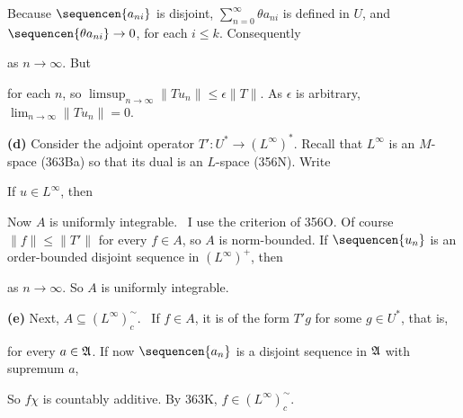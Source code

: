 {Because $\sequencen{a_{ni}}$ is disjoint, 
$\sum_{n=0}^{\infty}\theta a_{ni}$ is defined in $U$, 
and $\sequencen{\theta a_{ni}}\to 0$, for each $i\le k$.   Consequently


\noindent as $n\to\infty$.  But


\noindent for each $n$, so
$\limsup_{n\to\infty}\|Tu_n\|\le\epsilon\|T\|$.   As $\epsilon$ is
arbitrary, $\lim_{n\to\infty}\|Tu_n\|=0$.\ \Qed

\medskip

{\bf (d)} Consider the adjoint operator $T':U^*\to (L^{\infty})^*$.
Recall that $L^{\infty}$ is an $M$-space (363Ba) so that its dual is an
$L$-space (356N).   Write


\noindent If $u\in L^{\infty}$, then


\noindent Now $A$ is uniformly integrable.   \Prf\ I use the criterion
of 356O.   Of course $\|f\|\le\|T'\|$ for every $f\in A$, so $A$ is
norm-bounded.   If $\sequencen{u_n}$ is an order-bounded disjoint
sequence in $(L^{\infty})^+$, then


\noindent as $n\to\infty$.   So $A$ is uniformly integrable.\ \Qed

\medskip

{\bf (e)} Next, $A\subseteq(L^{\infty})^{\sim}_c$.   \Prf\ If $f\in A$,
it is of the form $T'g$ for some $g\in U^*$, that is,


\noindent for every $a\in\frak A$.   If now $\sequencen{a_n}$ is a
disjoint sequence in $\frak A$ with supremum $a$,


\noindent So $f\chi$ is countably additive.   By 363K,
$f\in(L^{\infty})^{\sim}_c$.\ \Qed

\medskip

}
